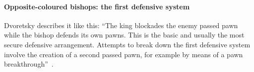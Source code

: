 
\paragraph{Opposite-coloured bishops: the first defensive system}\label{first-defence-system}
Dvoretsky describes it like this: ``The king blockades the enemy passed pawn while the bishop defends
its own pawns. This is the basic and usually the most secure defensive arrangement. Attempts to break
down the first defensive system involve the creation of a second passed pawn, for example by means
of a pawn breakthrough''~\cite{Dvoretsky:2008-endgame-manual}.
